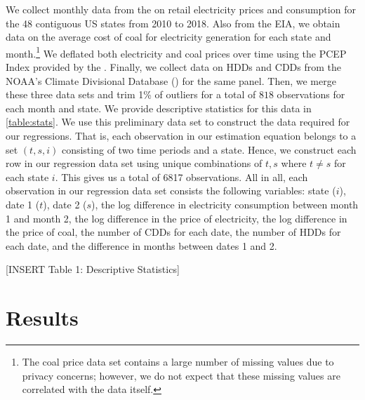 \documentclass[11pt,a4paper,leqno]{extarticle}
\begin{document}
	
	We collect monthly data from the \cite{EIANetgen} on retail electricity prices and consumption for the 48 contiguous US states from 2010 to 2018. Also from the EIA, we obtain data on the average cost of coal for electricity generation for each state and month.\footnote{ The coal price data set contains a large number of missing values due to privacy concerns; however, we do not expect that these missing values are correlated with the data itself.} We deflated both electricity and coal prices over time using the PCEP Index provided by the  \cite{USBEA}. Finally, we collect data on HDDs and CDDs from the NOAA's Climate Divisional Database (\citeyear{nCLIMDIV}) for the same panel. Then, we merge these three data sets and trim 1\% of outliers for a total of $818$ observations for each month and state. We provide descriptive statistics for this data in \autoref{table:stats}. We use this preliminary data set to construct the data required for our regressions. That is, each observation in our estimation equation belongs to a set $(t,s,i)$ consisting of two time periods and a state. Hence, we construct each row in our regression data set using unique combinations of $t,s$ where $t \neq s$ for each state $i$. This gives us a total of 6817 observations.  All in all, each observation in our regression data set consists the following variables: state ($i$), date 1 ($t$), date 2 ($s$), the log difference in electricity consumption between month 1 and month 2, the log difference in the price of electricity, the log difference in the price of coal, the number of CDDs for each date, the number of HDDs for each date, and the difference in months between dates 1 and 2. 
	
	\vspace{0.15in}
	\begin{center}
		[INSERT Table 1: Descriptive Statistics]
	\end{center}
	\vspace{0.15in}
	

	
	
	\section{Results}
	\label{sec:results}
	
	
	
	
	
	
	
\end{document}
